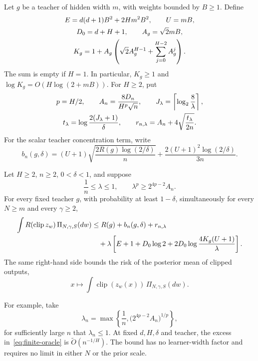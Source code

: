 Let $g$ be a teacher of hidden width $m$, with weights bounded by
$B\geq1$.  Define
\begin{gather}
 E=d(d+1)B^2+2Hm^2B^2,\qquad U=mB,\notag\\
 D_0=d+H+1,\qquad A_g=\sqrt2mB,\notag\\
 K_g=1+A_g\left(\sqrt2 A_g^{H-1}
                       +\sum_{j=0}^{H-2}A_g^j\right).
 \label{eq:finite-teacher-constants}
\end{gather}
The sum is empty if $H=1$.  In particular, $K_g\geq1$ and
$\log K_g=O(H\log(2+mB))$.
For $H\geq2$, put
\begin{gather}
 p=H/2,\qquad
 A_n=\frac{8D_n}{H^p\sqrt n},\qquad
 J_\lambda=\left\lceil\log_2\frac8\lambda\right\rceil,
 \notag\\
 t_\lambda=\log\frac{2(J_\lambda+1)}\delta,
 \qquad
 r_{n,\lambda}=A_n+4\sqrt{\frac{t_\lambda}{2n}}.
 \label{eq:finite-statistical-constants}
\end{gather}
For the scalar teacher concentration term, write
\begin{equation}
 b_n(g,\delta)
   =(U+1)\sqrt{\frac{2R(g)\log(2/\delta)}n}
       +\frac{2(U+1)^2\log(2/\delta)}{3n}.
 \label{eq:finite-teacher-deviation}
\end{equation}

\begin{theorem}
\label{thm:finite-gaussian-oracle}
Let $H\geq2$, $n\geq2$, $0<\delta<1$, and suppose
\begin{equation}
 \frac1n\leq\lambda\leq1,
 \qquad \lambda^p\geq2^{4p-2}A_n.
 \label{eq:finite-calibration}
\end{equation}
For every fixed teacher $g$, with probability at least $1-\delta$,
simultaneously for every $N\geq m$ and every $\gamma\geq2$,
\begin{align}
 \int R(\operatorname{clip}z_w)\,\Pi_{N,\gamma,S}(dw)
 &\leq R(g)+b_n(g,\delta)+r_{n,\lambda}\notag\\
 &\quad+\lambda\left[
 E+1+D_0\log2
       +2D_0\log\frac{4K_g(U+1)}\lambda\right].
 \label{eq:finite-oracle}
\end{align}
The same right-hand side bounds the risk of the posterior mean of
clipped outputs,
\[
 x\longmapsto\int\operatorname{clip}(z_w(x))\,
\Pi_{N,\gamma,S}(dw).
\]

For example, take
\begin{equation}
 \lambda_n=\max\left\{\frac1n,
                 \bigl(2^{4p-2}A_n\bigr)^{1/p}\right\},
 \label{eq:finite-schedule}
\end{equation}
for sufficiently large $n$ that $\lambda_n\leq1$.  At fixed
$d,H,\delta$ and teacher, the excess in~\eqref{eq:finite-oracle} is
$\widetilde O(n^{-1/H})$.  The bound has no learner-width factor and
requires no limit in either $N$ or the prior scale.
\end{theorem}

